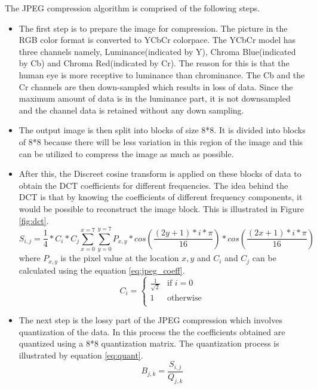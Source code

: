 The JPEG compression algorithm is comprised of the following steps.
\begin{itemize}
\item The first step is to prepare the image for compression. The picture in the RGB color format is converted to YCbCr colorpace. The YCbCr model has three channels namely, Luminance(indicated by Y), Chroma Blue(indicated by Cb) and Chroma Red(indicated by Cr). The reason for this is that the human eye is more receptive to luminance than chrominance. The Cb and the Cr channels are then down-sampled which results in loss of data. Since the maximum amount of data is in the luminance part, it is not downsampled and the channel data is retained without any down sampling. 
\item The output image is then split into blocks of size 8*8.  It is divided into blocks of 8*8 because there will be less variation in this region of the image and this can be utilized to compress the image as much as possible.
\item After this, the Discreet cosine transform is applied on these blocks of data to obtain the DCT coefficients for different frequencies. The idea behind the DCT is that by knowing the coefficients of different frequency components, it would be possible to reconstruct the image block. This is illustrated in Figure \ref{fig:dct}.
\begin{equation}
 S_{i,j} = \frac{1}{4} * C_i * C_j \sum_{x=0}^{x=7}\sum_{y=0}^{y=7}P_{x,y} *cos(\frac{(2y+1)*i*\pi}{16})*cos(\frac{(2x+1)*i*\pi}{16})
\end{equation}
where $P_{x,y}$ is the pixel value at the location $x,y$ and $C_i$ and $C_j$ can be calculated using the equation \ref{eq:jpeg_coeff}.
\begin{equation}
  C_i =
  \begin{cases}
    \frac{1}{\sqrt{2}} & \text{if $i = 0$} \\
    1 & \text{otherwise} \\
  \end{cases}
  \label{eq:jpeg_coeff}
\end{equation}
\item The next step is the lossy part of the JPEG compression which involves quantization of the data. In this process the the coefficients obtained are quantized using a 8*8 quantization matrix. The quantization process is illustrated by equation \ref{eq:quant}.
\begin{equation}
B_{j,k} = \frac{S_{i,j}}{Q_{j,k}}
\label{eq:quant}
\end{equation}


\end{itemize}
